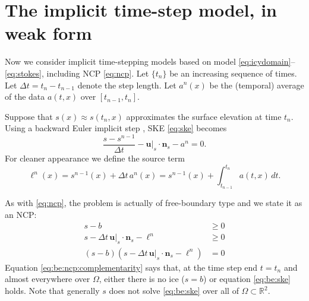 \documentclass[hidelinks,onefignum,onetabnum,final]{siamart220329}  %
\newcommand{\RR}{\mathbb{R}}
\newcommand{\bn}{\mathbf{n}}
\newcommand{\bu}{\mathbf{u}}
\begin{document}
\section{The implicit time-step model, in weak form} \label{sec:model}

Now we consider implicit time-stepping models based on model \eqref{eq:icydomain}--\eqref{eq:stokes}, including NCP \eqref{eq:ncp}.  Let $\{t_n\}$ be an increasing sequence of times.  Let $\Delta t = t_n-t_{n-1}$ denote the step length.  Let $a^n(x)$ be the (temporal) average of the data $a(t,x)$ over $[t_{n-1},t_n]$.

Suppose that $s(x)\approx s(t_n,x)$ approximates the surface elevation at time $t_n$.  Using a backward Euler implicit step \cite{AscherPetzold1998}, SKE \eqref{eq:ske} becomes
\begin{equation}
\frac{s - s^{n-1}}{\Delta t} - \bu|_{s} \cdot \bn_{s} - a^n = 0. \label{eq:be:ske}
\end{equation}
For cleaner appearance we define the source term
\begin{equation}
\ell^n(x) = s^{n-1}(x)+\Delta t\,a^n(x) = s^{n-1}(x) + \int_{t_{n-1}}^{t_n} a(t,x)\,dt. \label{eq:be:source}
\end{equation}

As with \eqref{eq:ncp}, the problem is actually of free-boundary type and we state it as an NCP:
\begin{subequations}
\label{eq:be:ncp}
\begin{align}
s - b &\ge 0 \label{eq:be:ncp:constraint} \\
s - \Delta t\,\bu|_s \cdot \bn_s - \ell^n &\ge 0 \\
(s - b) \left(s - \Delta t\,\bu|_s \cdot \bn_s - \ell^n\right) &= 0 \label{eq:be:ncp:complementarity}
\end{align}
\end{subequations}
Equation \eqref{eq:be:ncp:complementarity} says that, at the time step end $t=t_n$ and almost everywhere over $\Omega$, either there is no ice ($s=b$) or equation \eqref{eq:be:ske} holds.  Note that generally $s$ does not solve \eqref{eq:be:ske} over all of $\Omega \subset \RR^2$.
\end{document}
